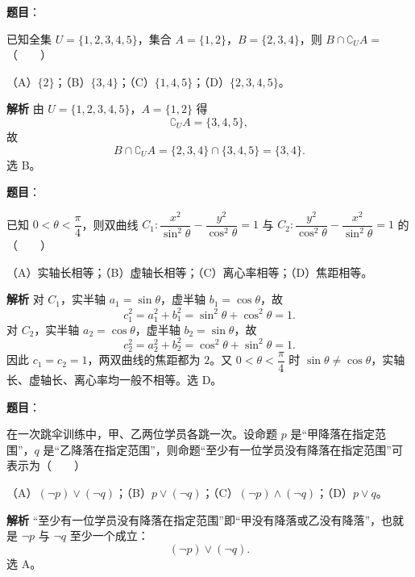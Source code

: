 
\begin{answer}

\textbf{题目}：

已知全集 $U=\{1,2,3,4,5\}$，集合 $A=\{1,2\}$，$B=\{2,3,4\}$，则 $B\cap\complement_U A=$\mbox{（　　）}

（A）$\{2\}$；（B）$\{3,4\}$；（C）$\{1,4,5\}$；（D）$\{2,3,4,5\}$。

\textbf{解析}
由 $U=\{1,2,3,4,5\}$，$A=\{1,2\}$ 得
\nopagebreak[4]
\[\complement_U A=\{3,4,5\},\]
故
\nopagebreak[4]
\[B\cap\complement_U A=\{2,3,4\}\cap\{3,4,5\}=\{3,4\}.\]
选 B。


\end{answer}
\begin{answer}

\textbf{题目}：

已知 $0<\theta<\dfrac\pi4$，则双曲线 $C_1:\dfrac{x^2}{\sin^2\theta}-\dfrac{y^2}{\cos^2\theta}=1$ 与 $C_2:\dfrac{y^2}{\cos^2\theta}-\dfrac{x^2}{\sin^2\theta}=1$ 的\mbox{（　　）}

（A）实轴长相等；（B）虚轴长相等；（C）离心率相等；（D）焦距相等。

\textbf{解析}
对 $C_1$，实半轴 $a_1=\sin\theta$，虚半轴 $b_1=\cos\theta$，故
\nopagebreak[4]
\[c_1^2=a_1^2+b_1^2=\sin^2\theta+\cos^2\theta=1.\]
对 $C_2$，实半轴 $a_2=\cos\theta$，虚半轴 $b_2=\sin\theta$，故
\nopagebreak[4]
\[c_2^2=a_2^2+b_2^2=\cos^2\theta+\sin^2\theta=1.\]
因此 $c_1=c_2=1$，两双曲线的焦距都为 $2$。又 $0<\theta<\dfrac\pi4$ 时 $\sin\theta\neq\cos\theta$，实轴长、虚轴长、离心率均一般不相等。选 D。


\end{answer}
\begin{answer}

\textbf{题目}：

在一次跳伞训练中，甲、乙两位学员各跳一次。设命题 $p$ 是“甲降落在指定范围”，$q$ 是“乙降落在指定范围”，则命题“至少有一位学员没有降落在指定范围”可表示为\mbox{（　　）}

（A）$(\neg p)\lor(\neg q)$；（B）$p\lor(\neg q)$；（C）$(\neg p)\land(\neg q)$；（D）$p\lor q$。

\textbf{解析}
“至少有一位学员没有降落在指定范围”即“甲没有降落或乙没有降落”，也就是 $\neg p$ 与 $\neg q$ 至少一个成立：
\nopagebreak[4]
\[(\neg p)\lor(\neg q).\]
选 A。


\end{answer}
